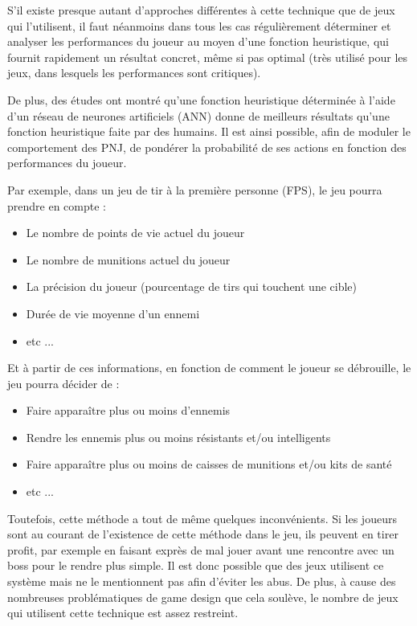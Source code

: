 \documentclass[a4paper, 12pt]{article} %
\begin{document}
\newpage
S’il existe presque autant d’approches différentes à cette technique que de jeux qui l’utilisent, il faut néanmoins dans tous les cas régulièrement déterminer et analyser les performances du joueur au moyen d’une fonction heuristique, qui fournit rapidement un résultat concret, même si pas optimal (très utilisé pour les jeux, dans lesquels les performances sont critiques).

De plus, des études ont montré qu’une fonction heuristique déterminée à l’aide d’un réseau de neurones artificiels (ANN) donne de meilleurs résultats qu’une fonction heuristique faite par des humains.
Il est ainsi possible, afin de moduler le comportement des PNJ, de pondérer la probabilité de ses actions en fonction des performances du joueur.

Par exemple, dans un jeu de tir à la première personne (FPS), le jeu pourra prendre en compte :

\begin{itemize}
	\item Le nombre de points de vie actuel du joueur
	\item Le nombre de munitions actuel du joueur
	\item La précision du joueur (pourcentage de tirs qui touchent une cible)
	\item Durée de vie moyenne d’un ennemi
	\item etc ...
\end{itemize}

Et à partir de ces informations, en fonction de comment le joueur se débrouille, le jeu pourra décider de :

\begin{itemize}
	\item Faire apparaître plus ou moins d’ennemis
	\item Rendre les ennemis plus ou moins résistants et/ou intelligents
	\item Faire apparaître plus ou moins de caisses de munitions et/ou kits de santé
	\item etc ...
\end{itemize}

Toutefois, cette méthode a tout de même quelques inconvénients. Si les joueurs sont au courant de l'existence de cette méthode dans le jeu, ils peuvent en tirer profit, par exemple en faisant exprès de mal jouer avant une rencontre avec un boss pour le rendre plus simple. Il est donc possible que des jeux utilisent ce système mais ne le mentionnent pas afin d'éviter les abus. De plus, à cause des nombreuses problématiques de game design que cela soulève, le nombre de jeux qui utilisent cette technique est assez restreint.
\end{document}
